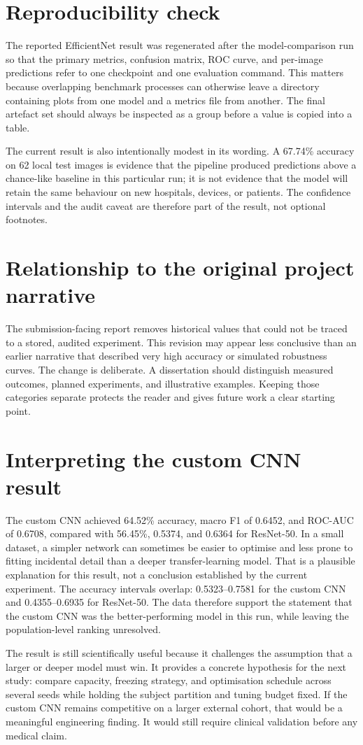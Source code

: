 \section{Reproducibility check}
The reported EfficientNet result was regenerated after the model-comparison run so that the primary metrics, confusion matrix, ROC curve, and per-image predictions refer to one checkpoint and one evaluation command. This matters because overlapping benchmark processes can otherwise leave a directory containing plots from one model and a metrics file from another. The final artefact set should always be inspected as a group before a value is copied into a table.

The current result is also intentionally modest in its wording. A 67.74\% accuracy on 62 local test images is evidence that the pipeline produced predictions above a chance-like baseline in this particular run; it is not evidence that the model will retain the same behaviour on new hospitals, devices, or patients. The confidence intervals and the audit caveat are therefore part of the result, not optional footnotes.

\section{Relationship to the original project narrative}
The submission-facing report removes historical values that could not be traced to a stored, audited experiment. This revision may appear less conclusive than an earlier narrative that described very high accuracy or simulated robustness curves. The change is deliberate. A dissertation should distinguish measured outcomes, planned experiments, and illustrative examples. Keeping those categories separate protects the reader and gives future work a clear starting point.

\section{Interpreting the custom CNN result}
The custom CNN achieved 64.52\% accuracy, macro F1 of 0.6452, and ROC-AUC of 0.6708, compared with 56.45\%, 0.5374, and 0.6364 for ResNet-50. In a small dataset, a simpler network can sometimes be easier to optimise and less prone to fitting incidental detail than a deeper transfer-learning model. That is a plausible explanation for this result, not a conclusion established by the current experiment. The accuracy intervals overlap: 0.5323--0.7581 for the custom CNN and 0.4355--0.6935 for ResNet-50. The data therefore support the statement that the custom CNN was the better-performing model in this run, while leaving the population-level ranking unresolved.

The result is still scientifically useful because it challenges the assumption that a larger or deeper model must win. It provides a concrete hypothesis for the next study: compare capacity, freezing strategy, and optimisation schedule across several seeds while holding the subject partition and tuning budget fixed. If the custom CNN remains competitive on a larger external cohort, that would be a meaningful engineering finding. It would still require clinical validation before any medical claim.
